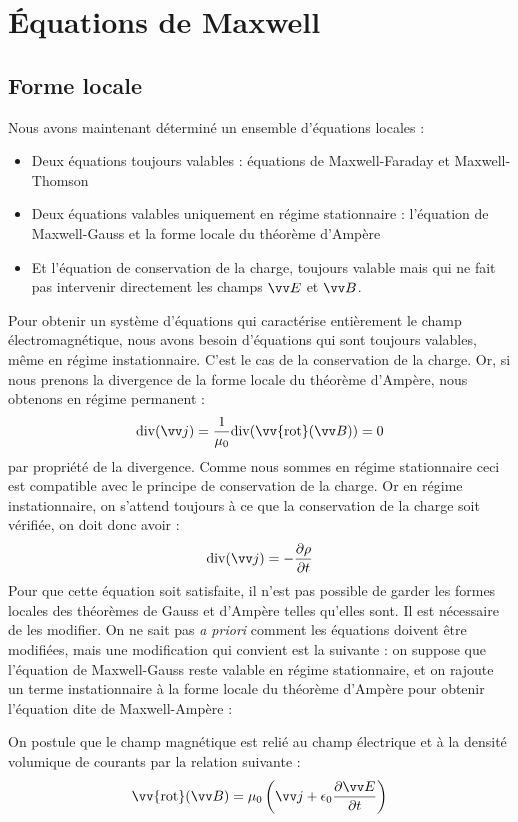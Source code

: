\documentclass[11pt,fleqn]{book} %
\renewcommand{\div}{\mathrm{div}}
\newcommand{\rot}{\vv{\mathrm{rot}}}
\begin{document}
\section{\'{E}quations de Maxwell}

\subsection{Forme locale}

Nous avons maintenant déterminé un ensemble d'équations locales :
\begin{itemize}
	\item Deux équations toujours valables : équations de Maxwell-Faraday et Maxwell-Thomson
	\item Deux équations valables uniquement en régime stationnaire : l'équation de Maxwell-Gauss et la forme locale du théorème d'Ampère
	\item Et l'équation de conservation de la charge, toujours valable mais qui ne fait pas intervenir directement les champs $\vv E$ et $\vv B$.
\end{itemize}

Pour obtenir un système d'équations qui caractérise entièrement le champ électromagnétique, nous avons besoin d'équations qui sont toujours valables, même en régime instationnaire. C'est le cas de la conservation de la charge. Or, si nous prenons la divergence de la forme locale du théorème d'Ampère, nous obtenons en régime permanent :
\begin{equation}
	\div(\vv j) = \frac{1}{\mu_0} \div(\rot(\vv B)) = 0
\end{equation}
par propriété de la divergence. Comme nous sommes en régime stationnaire ceci est compatible avec le principe de conservation de la charge. Or en régime instationnaire, on s'attend toujours à ce que la conservation de la charge soit vérifiée, on doit donc avoir :
\begin{equation}
	\div(\vv j) = - \frac{\partial \rho}{\partial t}
\end{equation}
Pour que cette équation soit satisfaite, il n'est pas possible de garder les formes locales des théorèmes de Gauss et d'Ampère telles qu'elles sont. Il est nécessaire de les modifier. On ne sait pas \textit{a priori} comment les équations doivent être modifiées, mais une modification qui convient est la suivante : on suppose que l'équation de Maxwell-Gauss reste valable en régime stationnaire, et on rajoute un terme instationnaire à la forme locale du théorème d'Ampère pour obtenir l'équation dite de Maxwell-Ampère :
\begin{proposition}
On postule que le champ magnétique est relié au champ électrique et à la densité volumique de courants par la relation suivante :
\begin{equation}
	\rot(\vv B) = \mu_0 \left( \vv j + \epsilon_0 \frac{\partial \vv E}{\partial t} \right)
\end{equation}
\end{proposition}
\end{document}
